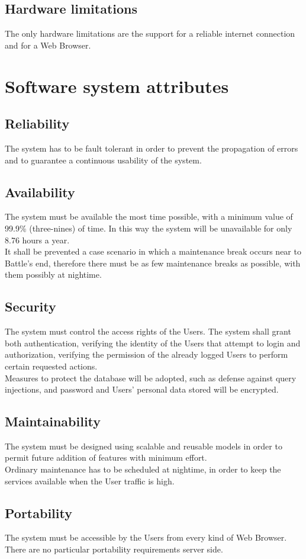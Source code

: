 \subsection{Hardware limitations}
\label{subsec:hardware_limitations}%
The only hardware limitations are the support for a reliable internet connection and for a Web Browser.


\section{Software system attributes}
\label{sec:software_system_attributes}%

\subsection{Reliability}
\label{subsec:reliability}%
The system has to be fault tolerant in order to prevent the propagation of errors and to guarantee a continuous usability of the system.

\subsection{Availability}
\label{subsec:availability}%
The system must be available the most time possible, with a minimum value of 99.9\% (three-nines) of time. In this way the system will be unavailable for only 8.76 hours a year. \\
It shall be prevented a case scenario in which a maintenance break occurs near to Battle's end, therefore there must be as few maintenance breaks as possible, with them possibly at nightime.

\subsection{Security}
\label{subsec:security}%
The system must control the access rights of the Users. The system shall grant both authentication, verifying the identity of the Users that attempt to login and authorization, verifying the permission of the already logged Users to perform certain requested actions. \\
Measures to protect the database will be adopted, such as defense against query injections, and password and Users' personal data stored will be encrypted.


\subsection{Maintainability}
\label{subsec:maintainability}%
The system must be designed using scalable and reusable models in order to permit future addition of features with minimum effort. \\
Ordinary maintenance has to be scheduled at nightime, in order to keep the services available when the User traffic is high.

\subsection{Portability}
\label{subsec:portability}%
The system must be accessible by the Users from every kind of Web Browser.\\ 
There are no particular portability requirements server side.



